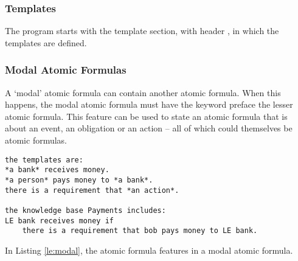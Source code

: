 \documentclass[../main.tex]{subfiles}
\begin{document}
\subsubsection{Templates}
The program starts with the template section, with header , in which the templates are defined. 

\subsubsection{Modal Atomic Formulas}
A `modal' atomic formula can contain another atomic formula. When this happens, the modal atomic formula must have the keyword  preface the lesser atomic formula. This feature can be used to state an atomic formula that is about an event, an obligation or an action -- all of which could themselves be atomic formulas.

\begin{lstlisting}[language=LE,label={le:modal},caption={An example of an atomic formula featuring in a modal atomic formula.}]
the templates are:
*a bank* receives money.
*a person* pays money to *a bank*.
there is a requirement that *an action*.

the knowledge base Payments includes:
LE bank receives money if
    there is a requirement that bob pays money to LE bank.
\end{lstlisting}
In Listing \ref{le:modal}, the atomic formula  features in a modal atomic formula.
\end{document}

